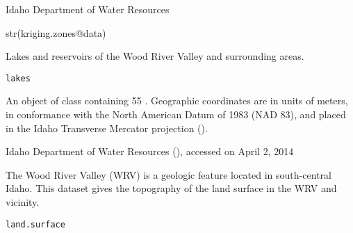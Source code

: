 \documentclass[a4paper]{book}
\begin{document}
%
\begin{Source}\relax
Idaho Department of Water Resources
\end{Source}
%
\begin{SeeAlso}\relax
{}
\end{SeeAlso}
%
\begin{Examples}
\begin{ExampleCode}
str(kriging.zones@data)
\end{ExampleCode}
\end{Examples}
%
\begin{Description}\relax
Lakes and reservoirs of the Wood River Valley and surrounding areas.
\end{Description}
%
\begin{Usage}
\begin{verbatim}
lakes
\end{verbatim}
\end{Usage}
%
\begin{Format}
An object of  class containing 55 .
Geographic coordinates are in units of meters, in conformance with the North American Datum of 1983 (NAD 83), and placed in the
Idaho Transverse Mercator projection ().
\end{Format}
%
\begin{Source}\relax
Idaho Department of Water Resources (), accessed on April 2, 2014
\end{Source}
%
\begin{Examples}
\end{Examples}
%
\begin{Description}\relax
The Wood River Valley (WRV) is a geologic feature located in south-central Idaho.
This dataset gives the topography of the land surface in the WRV and vicinity.
\end{Description}
%
\begin{Usage}
\begin{verbatim}
land.surface
\end{verbatim}
\end{Usage}
\end{document}
